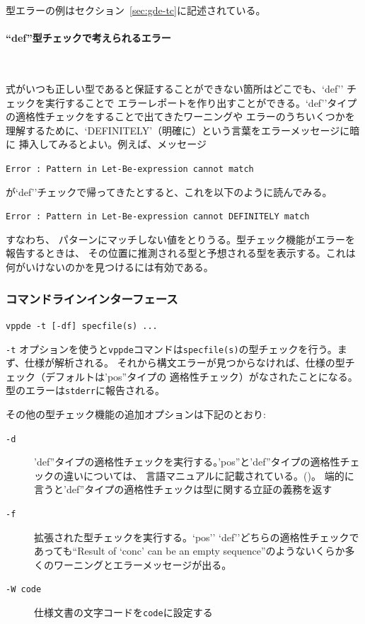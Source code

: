 \documentclass[\pformat,12pt]{jarticle}
\newcommand{\vdmde}{vppde}
\newcommand{\subsubsubsection}[1]{\paragraph{#1}\mbox{}\\}
\newcommand{\aaa}{\tt }
\begin{document}
型エラーの例はセクション~\ref{sec:gde-tc}に記述されている。

\subsubsubsection{``def''型チェックで考えられるエラー} 


式がいつも正しい型であると保証することができない箇所はどこでも、`def'' チェックを実行することで
エラーレポートを作り出すことができる。`def''タイプの適格性チェックをすることで出てきたワーニングや
エラーのうちいくつかを理解するために、`DEFINITELY'（明確に）という言葉をエラーメッセージに暗に
挿入してみるとよい。例えば、メッセージ

{\tt Error : Pattern in Let-Be-expression cannot match}

が`def''チェックで帰ってきたとすると、これを以下のように読んでみる。

{\tt Error : Pattern in Let-Be-expression cannot DEFINITELY match}

すなわち、 パターンにマッチしない値をとりうる。型チェック機能がエラーを報告するときは、
その位置に推測される型と予想される型を表示する。これは何がいけないのかを見つけるには有効である。

\subsubsection{コマンドラインインターフェース} 

{\tt \vdmde\ -t [-df] specfile(s) ...}

\vspace{0.5cm}

\noindent

{\tt -t} オプションを使うと{\tt \vdmde}コマンドは{\tt specfile(s)}の型チェックを行う。まず、仕様が解析される。
それから構文エラーが見つからなければ、仕様の型チェック（デフォルトは'pos''タイプの
適格性チェック）がなされたことになる。型のエラーは{\aaa stderr}に報告される。

その他の型チェック機能の追加オプションは下記のとおり:

\begin{description}

\item[{\tt -d}]
  'def''タイプの適格性チェックを実行する。'pos''と'def''タイプの適格性チェックの違いについては、
  言語マニュアルに記載されている。()。
  端的に言うと'def''タイプの適格性チェックは型に関する立証の義務を返す
  
\item[{\tt -f}]
  拡張された型チェックを実行する。`pos'' `def''どちらの適格性チェックであっても``Result of `conc' 
  can be an empty sequence''のようないくらか多くのワーニングとエラーメッセージが出る。

\item[{\tt -W code}] 仕様文書の文字コードを{\tt code}に設定する
\end{description}
\end{document}
